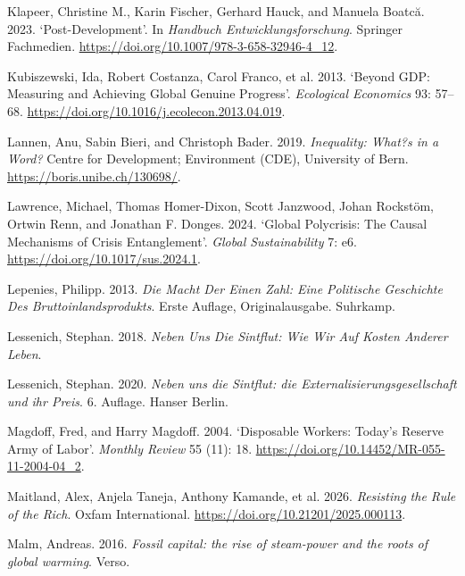 \documentclass[
  british,
  a4paper,
  DIV=11,
  numbers=noendperiod,
  oneside,
  openany]{scrreprt}
\newlength{\cslhangindent}
\newenvironment{CSLReferences}[2] %
 {\begin{list}{}{%
  \setlength{\itemindent}{0pt}
  \setlength{\leftmargin}{0pt}
  \setlength{\parsep}{0pt}
  \ifodd #1
   \setlength{\leftmargin}{\cslhangindent}
   \setlength{\itemindent}{-1\cslhangindent}
  \fi
  \setlength{\itemsep}{#2\baselineskip}}}
 {\end{list}}
\begin{document}
\begin{CSLReferences}{1}{1}
Klapeer, Christine M., Karin Fischer, Gerhard Hauck, and Manuela Boatcă.
2023. {`Post-Development'}. In \emph{Handbuch Entwicklungsforschung}.
Springer Fachmedien. \url{https://doi.org/10.1007/978-3-658-32946-4_12}.

Kubiszewski, Ida, Robert Costanza, Carol Franco, et al. 2013. {`Beyond
GDP: Measuring and Achieving Global Genuine Progress'}. \emph{Ecological
Economics} 93: 57--68.
\url{https://doi.org/10.1016/j.ecolecon.2013.04.019}.

Lannen, Anu, Sabin Bieri, and Christoph Bader. 2019. \emph{Inequality:
What?s in a Word?} Centre for Development; Environment (CDE), University
of Bern. \url{https://boris.unibe.ch/130698/}.

Lawrence, Michael, Thomas Homer-Dixon, Scott Janzwood, Johan Rockstöm,
Ortwin Renn, and Jonathan F. Donges. 2024. {`Global Polycrisis: The
Causal Mechanisms of Crisis Entanglement'}. \emph{Global Sustainability}
7: e6. \url{https://doi.org/10.1017/sus.2024.1}.

Lepenies, Philipp. 2013. \emph{Die Macht Der Einen Zahl: Eine Politische
Geschichte Des Bruttoinlandsprodukts}. Erste Auflage, Originalausgabe.
Suhrkamp.

Lessenich, Stephan. 2018. \emph{Neben Uns Die Sintflut: Wie Wir Auf
Kosten Anderer Leben}.

Lessenich, Stephan. 2020. \emph{Neben uns die Sintflut: die
Externalisierungsgesellschaft und ihr Preis}. 6. Auflage. Hanser Berlin.

Magdoff, Fred, and Harry Magdoff. 2004. {`Disposable Workers: Today's
Reserve Army of Labor'}. \emph{Monthly Review} 55 (11): 18.
\url{https://doi.org/10.14452/MR-055-11-2004-04_2}.

Maitland, Alex, Anjela Taneja, Anthony Kamande, et al. 2026.
\emph{Resisting the {Rule} of the {Rich}}. Oxfam International.
\url{https://doi.org/10.21201/2025.000113}.

Malm, Andreas. 2016. \emph{Fossil capital: the rise of steam-power and
the roots of global warming}. Verso.


\end{CSLReferences}
\end{document}
